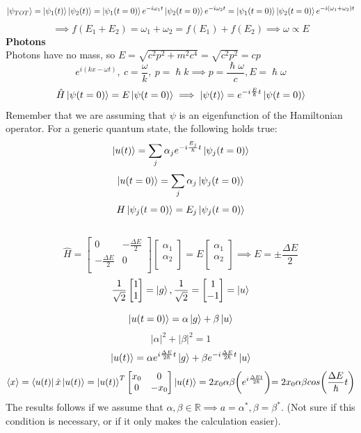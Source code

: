 \documentclass{article}
\begin{document}
$$\ket{\psi_{TOT}} = \ket{\psi_1(t)}\ket{\psi_2(t)} = \ket{\psi_1(t=0)}e^{-i\omega_1t}\ket{\psi_2(t=0)}e^{-i\omega_2 t} = \ket{\psi_1(t=0)}\ket{\psi_2(t=0)}e^{-i(\omega_1+\omega_2)t}$$
$$\implies f(E_1+E_2) = \omega_1 + \omega_2 = f(E_1)+ f(E_2) \implies \omega \varpropto E$$
\textbf{Photons} \\
Photons have no mass, so $E = \sqrt{c^2p^2+m^2c^4} = \sqrt{c^2p^2} = cp$
$$e^{i(kx-\omega t)}, \ c = \frac{\omega}{k}, \ p = \hslash k \implies p =  \frac{\hslash\omega}{c}, E = \hslash \omega$$
$$\hat{H}\ket{\psi(t=0)} = E \ket{\psi(t=0)}  \implies \ket{\psi(t)} = e^{-i\frac{E}{\hslash}t} \ket{\psi(t=0)}$$
Remember that we are assuming that $\psi$ is an eigenfunction of the Hamiltonian operator.
For a generic quantum state, the following holds true:
$$\ket{u(t)} = \sum_j \alpha_j e^{-i\frac{E_j}{\hslash}t} \ket{\psi_j(t=0)}$$
$$\ket{u(t=0)} = \sum_j \alpha_j \ket{\psi_j(t=0)}$$
$$H\ket{\psi_j(t=0)} = E_j \ket{\psi_j(t=0)}$$ \\ 
$$\hat{H} = \begin{bmatrix}
    0 & -\frac{\Delta E}{2} \\
    -\frac{\Delta E}{2} & 0 \\
\end{bmatrix} \begin{bmatrix}
    \alpha_1  \\
      \alpha_2 \\
\end{bmatrix} = E \begin{bmatrix}
    \alpha_1  \\
      \alpha_2 \\
\end{bmatrix} \implies E = \pm \frac{\Delta E}{2}$$ 
$$\frac{1}{\sqrt{2}}  \begin{bmatrix}
    1 \\
    1 \\
\end{bmatrix} = \ket{g}, \frac{1}{\sqrt{2}} = \begin{bmatrix}
    1 \\
    -1 \\
\end{bmatrix} = \ket{u}$$

$$\ket{u(t=0)} = \alpha \ket{g} + \beta \ket{u}$$
$$|\alpha|^2+|\beta|^2 = 1$$
$$\ket{u(t)}= \alpha e^{i \frac{\Delta E}{2 \hslash}t} \ket{g}+ \beta e^{-i \frac{\Delta E}{2 \hslash}t} \ket{u}$$
$$\langle x \rangle  = \bra{u(t)} \hat{x} \ket{u(t)} =\ket{u(t)}^T \begin{bmatrix}
    x_0 & 0 \\
    0 & -x_0 \\
\end{bmatrix} \ket{u(t)} =2 x_0 \alpha \beta \biggl( e^{i \frac{\Delta E t}{2 \hslash}} \biggl) =2 x_0 \alpha \beta cos\biggl(\frac{\Delta E}{\hslash}t\biggl)$$
The results follows if we assume that $\alpha, \beta \in \mathbb{R} \implies a = \alpha^*, \beta = \beta^*$. (Not sure if this condition is necessary, or if it only makes the calculation easier).
\end{document}
